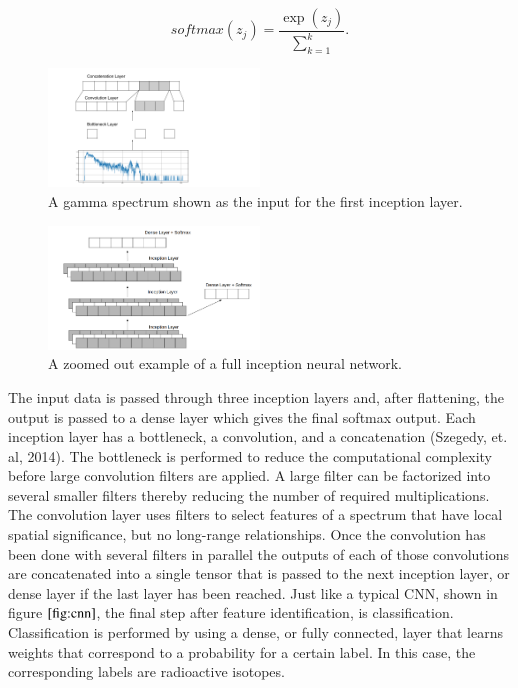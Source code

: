 \documentclass{anstrans}
\begin{document}
\begin{equation}
softmax(z_j) = \frac{\exp(z_j)}{\sum_{k=1}^{k}}.
\end{equation}

\begin{figure}[h]
    \centering
    \includegraphics[width=0.5\textwidth]{inn-layer_figure.png}
    \caption{A gamma spectrum shown as the input for the first inception layer.}
    \label{fig:inn-layer}
\end{figure}
\begin{figure}[h]
    \centering
    \includegraphics[width=0.5\textwidth]{inn-full-figure.png}
    \caption{A zoomed out example of a full inception neural network.}
    \label{fig:inn-full}
\end{figure}

The input data is passed through three inception layers and, after flattening, the output is passed to a dense layer which gives the final softmax output. 
Each inception layer has a bottleneck, a convolution, and a concatenation (Szegedy, et. al, 2014).
The bottleneck is performed to reduce the computational complexity before large convolution filters are applied. 
A large filter can be factorized into several smaller filters thereby reducing the number of required multiplications. 
The convolution layer uses filters to select features of a spectrum that have local spatial significance, but no long-range relationships. 
Once the convolution has been done with several filters in parallel the outputs of each of those convolutions are concatenated into a single tensor that is passed to the next inception layer, or dense layer if the last layer has been reached. 
Just like a typical CNN, shown in figure $\ref{fig:cnn}$, the final step after feature identification, is classification. 
Classification is performed by using a dense, or fully connected, layer that learns weights that correspond to a probability for a certain label. 
In this case, the corresponding labels are radioactive isotopes.
\end{document}
